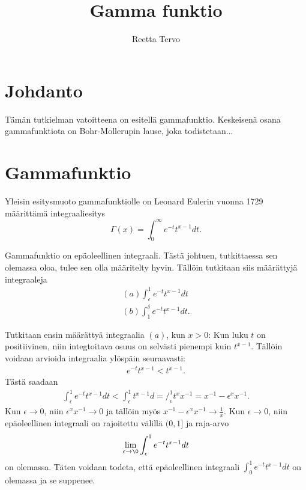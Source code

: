 \documentclass[12pt]{article}
\title{Gamma funktio}
\author{Reetta Tervo}
\theoremstyle{definition}
\theoremstyle{plain}
\begin{document}
\maketitle

\newpage
\tableofcontents

\newpage
\section{Johdanto}
\onehalfspacing
Tämän tutkielman vatoitteena on esitellä gammafunktio. Keskeisenä osana gammafunktiota on Bohr-Mollerupin lause, joka todistetaan...

\newpage





\section{Gammafunktio}
Yleisin esitysmuoto gammafunktiolle on Leonard Eulerin vuonna 1729 määrittämä integraaliesitys
\begin{equation}\label{yhtalo:gammafunktio}
     \Gamma(x) = \int_{0}^{\infty} e^{-t} t^{x-1} dt.
\end{equation}

Gammafunktio on epäoleellinen integraali. Tästä johtuen, tutkittaessa sen olemassa oloa, tulee sen olla määritelty hyvin. Tällöin tutkitaan siis määrättyjä integraaleja
\begin{align*}
    (a) \int_{\epsilon}^{1} e^{-t} t^{x-1} dt \\
    (b) \int_{1}^{\delta} e^{-t} t^{x-1} dt.
\end{align*}

Tutkitaan ensin määrättyä integraalia $(a)$, kun $x>0$:\newline
Kun luku $t$ on positiivinen, niin integtoitava osuus on selvästi pienempi kuin $t^{x-1}$. Tällöin voidaan arvioida integraalia ylöspäin seuraavasti:
\begin{align*}
    e^{-t} t^{x-1} < t^{x-1}.
\end{align*} 
Tästä saadaan 
\begin{align*}
    \int_{\epsilon}^{1} e^{-t} t^{x-1} dt < \int_{\epsilon}^{1} t^{x-1} d = \Big/_\epsilon^1 {t^x}x^{-1} = x^{-1} - \epsilon{^x}x^{-1}.
\end{align*}
Kun $\epsilon \rightarrow 0$, niin $\epsilon^{x}x^{-1} \rightarrow 0$ ja tällöin myös $x^{-1}-\epsilon{^x}x^{-1} \rightarrow \frac{1}{x}$. Kun $\epsilon\rightarrow0$, niin epäoleellinen integraali on  rajoitettu välillä $(0, 1]$ ja raja-arvo
\begin{align*}
    \lim_{\epsilon\to\0}\int_\epsilon^{1}e^{-t}t^{x-1}dt
\end{align*}
on olemassa. Täten voidaan todeta, että epäoleellinen integraali $\int_{0}^{1} e^{-t} t^{x-1} dt$ on olemassa ja se suppenee. \newline
\end{document}
